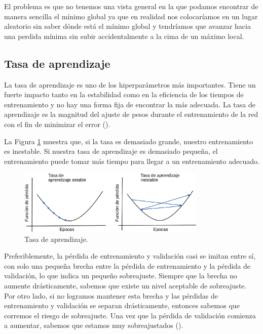 El problema es que no tenemos una vista general en la que podamos encontrar de manera sencilla el mínimo global ya que en realidad nos colocaríamos en un lugar aleatorio sin saber dónde está el mínimo global y tendríamos que avanzar hacia una perdida mínima sin subir accidentalmente a la cima de un máximo local.

\subsection{Tasa de aprendizaje}

La tasa de aprendizaje es uno de los hiperparámetros más importantes. Tiene un fuerte impacto tanto en la estabilidad como en la eficiencia de los tiempos de entrenamiento y no hay una forma fija de encontrar la más adecuada. La tasa de aprendizaje es la magnitud del ajuste de pesos durante el entrenamiento de la red con el fin de minimizar el error (\cite{valenzuela2020Sistema}).

La Figura \ref{fig:learningRate} muestra que, si la tasa es demasiado grande, nuestro entrenamiento es inestable. Si nuestra tasa de aprendizaje es demasiado pequeña, el entrenamiento puede tomar más tiempo para llegar a un entrenamiento adecuado.

\begin{figure}[H]
    \centering
    \includegraphics[width=0.8\textwidth]{MarcoTeorico/imgs/LearningRate.png}
    \caption{Tasa de aprendizaje.}
    \label{fig:learningRate}
\end{figure}

Preferiblemente, la pérdida de entrenamiento y validación casi se imitan entre sí, con solo una pequeña brecha entre la pérdida de entrenamiento y la pérdida de validación, lo que indica un pequeño sobreajuste. Siempre que la brecha no aumente drásticamente, sabemos que existe un nivel aceptable de sobreajuste. Por otro lado, si no logramos mantener esta brecha y las pérdidas de entrenamiento y validación se separan drásticamente, entonces sabemos que corremos el riesgo de sobreajuste. Una vez que la pérdida de validación comienza a aumentar, sabemos que estamos muy sobreajustados (\cite{rosebrock2017deep}).


